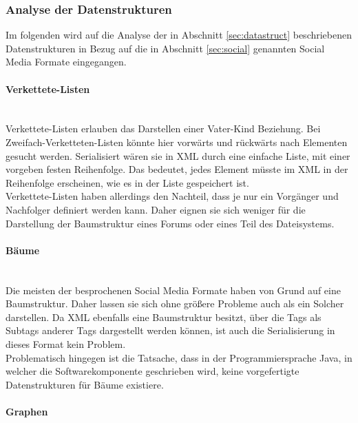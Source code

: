 \documentclass[a4paper]{article}
\begin{document}
	\subsubsection{Analyse der Datenstrukturen}
	
	Im folgenden wird auf die Analyse der in  Abschnitt \ref{sec:datastruct}
	beschriebenen Datenstrukturen in Bezug auf die in Abschnitt \ref{sec:social}
	genannten Social Media Formate eingegangen.
	
	\paragraph{Verkettete-Listen}\mbox{} \\
	
	Verkettete-Listen erlauben das Darstellen einer Vater-Kind Beziehung. Bei
	Zweifach-Verketteten-Listen könnte hier vorwärts und rückwärts nach Elementen
	gesucht werden. Serialisiert wären sie in XML durch eine einfache Liste,
	mit einer vorgeben festen Reihenfolge. Das bedeutet, jedes Element müsste
	im XML in der Reihenfolge erscheinen, wie es in der Liste gespeichert ist. \\
	
	Verkettete-Listen haben allerdings den Nachteil, dass je nur ein
	Vorgänger und Nachfolger definiert werden kann. Daher eignen sie sich weniger
	für die Darstellung der Baumstruktur eines Forums oder eines Teil des
	Dateisystems. 	
	
	\paragraph{Bäume}\mbox{} \\
	
	Die meisten der besprochenen Social Media Formate haben von Grund auf eine
	Baumstruktur. Daher lassen sie sich ohne größere Probleme auch als ein
	Solcher darstellen. Da XML ebenfalls eine Baumstruktur besitzt, über
	die Tags als Subtags anderer Tags dargestellt werden können, ist auch
	die Serialisierung in dieses Format kein Problem. \\
	
	Problematisch hingegen ist die Tatsache, dass in der Programmiersprache 
	Java, in welcher die Softwarekomponente geschrieben wird, keine vorgefertigte
	Datenstrukturen für Bäume existiere.
	
	\paragraph{Graphen}\mbox{} \\
	
\end{document}
